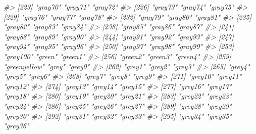 \documentclass[
]{book}
\newenvironment{Shaded}{\begin{snugshade}}{\end{snugshade}}
\newcommand{\CommentTok}[1]{\textcolor[rgb]{0.56,0.35,0.01}{\textit{#1}}}
\begin{document}
\begin{Shaded}
\begin{Highlighting}[]
\CommentTok{\#\textgreater{} [223] "gray70"               "gray71"               "gray72"              }
\CommentTok{\#\textgreater{} [226] "gray73"               "gray74"               "gray75"              }
\CommentTok{\#\textgreater{} [229] "gray76"               "gray77"               "gray78"              }
\CommentTok{\#\textgreater{} [232] "gray79"               "gray80"               "gray81"              }
\CommentTok{\#\textgreater{} [235] "gray82"               "gray83"               "gray84"              }
\CommentTok{\#\textgreater{} [238] "gray85"               "gray86"               "gray87"              }
\CommentTok{\#\textgreater{} [241] "gray88"               "gray89"               "gray90"              }
\CommentTok{\#\textgreater{} [244] "gray91"               "gray92"               "gray93"              }
\CommentTok{\#\textgreater{} [247] "gray94"               "gray95"               "gray96"              }
\CommentTok{\#\textgreater{} [250] "gray97"               "gray98"               "gray99"              }
\CommentTok{\#\textgreater{} [253] "gray100"              "green"                "green1"              }
\CommentTok{\#\textgreater{} [256] "green2"               "green3"               "green4"              }
\CommentTok{\#\textgreater{} [259] "greenyellow"          "grey"                 "grey0"               }
\CommentTok{\#\textgreater{} [262] "grey1"                "grey2"                "grey3"               }
\CommentTok{\#\textgreater{} [265] "grey4"                "grey5"                "grey6"               }
\CommentTok{\#\textgreater{} [268] "grey7"                "grey8"                "grey9"               }
\CommentTok{\#\textgreater{} [271] "grey10"               "grey11"               "grey12"              }
\CommentTok{\#\textgreater{} [274] "grey13"               "grey14"               "grey15"              }
\CommentTok{\#\textgreater{} [277] "grey16"               "grey17"               "grey18"              }
\CommentTok{\#\textgreater{} [280] "grey19"               "grey20"               "grey21"              }
\CommentTok{\#\textgreater{} [283] "grey22"               "grey23"               "grey24"              }
\CommentTok{\#\textgreater{} [286] "grey25"               "grey26"               "grey27"              }
\CommentTok{\#\textgreater{} [289] "grey28"               "grey29"               "grey30"              }
\CommentTok{\#\textgreater{} [292] "grey31"               "grey32"               "grey33"              }
\CommentTok{\#\textgreater{} [295] "grey34"               "grey35"               "grey36"              }

\end{Highlighting}
\end{Shaded}
\end{document}

